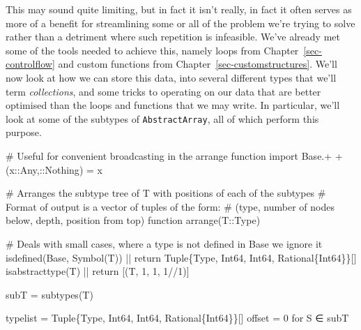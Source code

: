 \documentclass[
  letterpaper,
  DIV=11,
  numbers=noendperiod]{scrreprt}
\newenvironment{Shaded}{\begin{snugshade}}{\end{snugshade}}
\newcommand{\BuiltInTok}[1]{\textcolor[rgb]{0.00,0.23,0.31}{#1}}
\newcommand{\CommentTok}[1]{\textcolor[rgb]{0.37,0.37,0.37}{#1}}
\newcommand{\ControlFlowTok}[1]{\textcolor[rgb]{0.00,0.23,0.31}{#1}}
\newcommand{\DataTypeTok}[1]{\textcolor[rgb]{0.68,0.00,0.00}{#1}}
\newcommand{\FloatTok}[1]{\textcolor[rgb]{0.68,0.00,0.00}{#1}}
\newcommand{\FunctionTok}[1]{\textcolor[rgb]{0.28,0.35,0.67}{#1}}
\newcommand{\ImportTok}[1]{\textcolor[rgb]{0.00,0.46,0.62}{#1}}
\newcommand{\KeywordTok}[1]{\textcolor[rgb]{0.00,0.23,0.31}{#1}}
\newcommand{\NormalTok}[1]{\textcolor[rgb]{0.00,0.23,0.31}{#1}}
\newcommand{\OperatorTok}[1]{\textcolor[rgb]{0.37,0.37,0.37}{#1}}
\begin{document}
This may sound quite limiting, but in fact it isn't really, in fact it
often serves as more of a benefit for streamlining some or all of the
problem we're trying to solve rather than a detriment where such
repetition is infeasible. We've already met some of the tools needed to
achieve this, namely loops from Chapter~\ref{sec-controlflow} and custom
functions from Chapter~\ref{sec-customstructures}. We'll now look at how
we can store this data, into several different types that we'll term
\emph{collections}, and some tricks to operating on our data that are
better optimised than the loops and functions that we may write. In
particular, we'll look at some of the subtypes of
\texttt{AbstractArray}, all of which perform this purpose.

\begin{Shaded}
\begin{Highlighting}[]
\CommentTok{\# Useful for convenient broadcasting in the arrange function}
\ImportTok{import} \BuiltInTok{Base.+}
\FunctionTok{+}\NormalTok{(x}\OperatorTok{::}\DataTypeTok{Any}\NormalTok{,}\OperatorTok{::}\DataTypeTok{Nothing}\NormalTok{) }\OperatorTok{=}\NormalTok{ x}

\CommentTok{\# Arranges the subtype tree of T with positions of each of the subtypes}
\CommentTok{\# Format of output is a vector of tuples of the form:}
\CommentTok{\#     (type, number of nodes below, depth, position from top)}
\KeywordTok{function} \FunctionTok{arrange}\NormalTok{(T}\OperatorTok{::}\DataTypeTok{Type}\NormalTok{)}

    \CommentTok{\# Deals with small cases, where a type is not defined in Base we ignore it}
    \FunctionTok{isdefined}\NormalTok{(}\BuiltInTok{Base}\NormalTok{, }\FunctionTok{Symbol}\NormalTok{(T)) }\OperatorTok{||} \ControlFlowTok{return} \DataTypeTok{Tuple}\NormalTok{\{}\DataTypeTok{Type}\NormalTok{, }\DataTypeTok{Int64}\NormalTok{, }\DataTypeTok{Int64}\NormalTok{, }\DataTypeTok{Rational}\NormalTok{\{}\DataTypeTok{Int64}\NormalTok{\}\}[]}
    \FunctionTok{isabstracttype}\NormalTok{(T) }\OperatorTok{||} \ControlFlowTok{return}\NormalTok{ [(T, }\FloatTok{1}\NormalTok{, }\FloatTok{1}\NormalTok{, }\FloatTok{1}\OperatorTok{//}\FloatTok{1}\NormalTok{)]}

\NormalTok{    subT }\OperatorTok{=} \FunctionTok{subtypes}\NormalTok{(T)}
    
\NormalTok{    typelist }\OperatorTok{=} \DataTypeTok{Tuple}\NormalTok{\{}\DataTypeTok{Type}\NormalTok{, }\DataTypeTok{Int64}\NormalTok{, }\DataTypeTok{Int64}\NormalTok{, }\DataTypeTok{Rational}\NormalTok{\{}\DataTypeTok{Int64}\NormalTok{\}\}[]}
\NormalTok{    offset }\OperatorTok{=} \FloatTok{0}
    \ControlFlowTok{for}\NormalTok{ S }\OperatorTok{∈}\NormalTok{ subT}
        

\end{Highlighting}
\end{Shaded}
\end{document}
